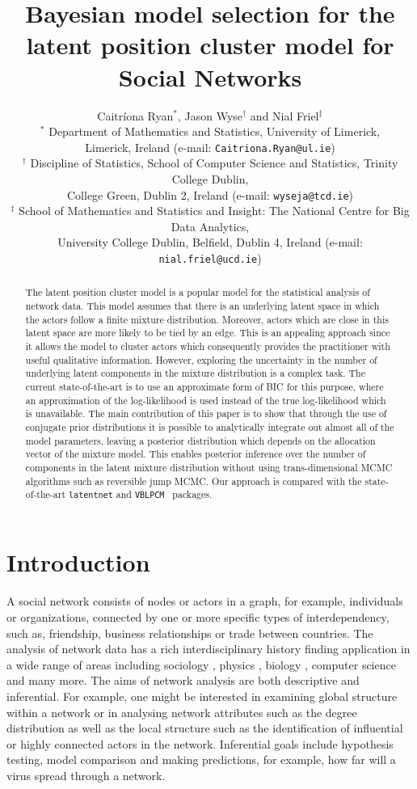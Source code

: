 \documentclass[12pt]{article}
\title{ Bayesian model selection for the latent position cluster model for Social Networks }
\author{Caitr\'{i}ona Ryan$^*$, Jason Wyse$^{\dagger}$ and Nial Friel$^{\ddagger}$ 
\\
{\small $^*$ Department of Mathematics and Statistics, University of Limerick,}\\{\small Limerick, Ireland (e-mail: \texttt{Caitriona.Ryan@ul.ie})}\\
{\small $^{\dagger}$ Discipline of Statistics, School of Computer Science and Statistics, Trinity College Dublin,}\\{\small College Green, Dublin 2, Ireland (e-mail: \texttt{wyseja@tcd.ie})}\\
{\small $^{\ddagger}$ School of Mathematics and Statistics and Insight: The National Centre for Big Data Analytics,}\\
{\small  University College Dublin, Belfield, Dublin 4, Ireland (e-mail: \texttt{nial.friel@ucd.ie})}}
\begin{document}
 \maketitle




\begin{abstract}

The latent position cluster model is a popular model for the statistical analysis of network data. This model assumes that 
there is an underlying latent space in which the actors follow a finite mixture distribution. Moreover, actors which are close in 
this latent space are more likely to be tied by an edge. This is an appealing approach since it allows the model to cluster actors which 
consequently provides the practitioner with useful qualitative information. However, exploring the uncertainty in the number 
of underlying latent components in the mixture distribution is a complex task. The current state-of-the-art is to use an
approximate form 
of BIC for this purpose, where an approximation of the log-likelihood is used instead of the true log-likelihood which is unavailable. 
The main contribution of this paper is to show that through the use of conjugate prior distributions it is possible to analytically 
integrate out almost all of the model parameters, leaving a posterior distribution which depends on the allocation vector of the mixture model. This enables posterior inference over the number of components in the latent mixture
distribution without using trans-dimensional MCMC algorithms such as reversible jump MCMC. Our approach is compared with the state-of-the-art \texttt{latentnet} \cite{Kriv:Hand13} and \texttt{VBLPCM}~\cite{salter:murphy12} packages.

\end{abstract}


\section{Introduction}

A social network consists of nodes or actors in a graph, for example, individuals or organizations, 
connected by one or more specific types of interdependency, such as, friendship, business relationships or trade between 
countries.  
The analysis of network data has a rich interdisciplinary history finding application in a wide range of areas including 
sociology \cite{wasserman:galaskiewicz1994}, 
physics \cite{adamicetal01}, 
biology \cite{michailidis12}, 
computer science \cite{faloutsosetal1999}
and many more. The aims of network analysis are both descriptive and inferential.
For example, one might be interested in examining global structure within a network or in analysing network attributes such 
as the degree distribution as well as the local structure such as the identification of influential or highly connected actors 
in the network. Inferential goals include hypothesis testing, model comparison and making predictions, for example, how far
will a virus spread through a network. 
\end{document}
